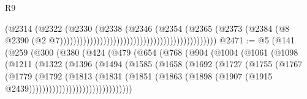 \begin{lexlean}{R9}
\begin{coremodule}
                                                                            (@2314
                                                                              (@2322
                                                                                (@2330
                                                                                  (@2338
                                                                                    (@2346
                                                                                      (@2354
                                                                                        (@2365
                                                                                          (@2373
                                                                                            (@2384
                                                                                              (@8
                                                                                                @2390
                                                                                                (@2
                                                                                                  @7)))))))))))))))))))))))))))))))))))))))))))))))
@2471 := @5
    (@141
      (@259
        (@300
          (@380
            (@424
              (@479
                (@654
                  (@768
                    (@904
                      (@1004
                        (@1061
                          (@1098
                            (@1211
                              (@1322
                                (@1396
                                  (@1494
                                    (@1585
                                      (@1658
                                        (@1692
                                          (@1727
                                            (@1755
                                              (@1767
                                                (@1779
                                                  (@1792
                                                    (@1813
                                                      (@1831
                                                        (@1851
                                                          (@1863
                                                            (@1898
                                                              (@1907
                                                                (@1915
                                                                  @2439)))))))))))))))))))))))))))))))

\end{coremodule}
\end{lexlean}
